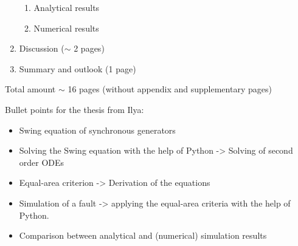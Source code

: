 \begin{enumerate}
\begin{enumerate}
        \item Analytical results
        \item Numerical results
    \end{enumerate}
    \item Discussion ($\sim$ 2 pages)
    \item Summary and outlook (1 page)
\end{enumerate}

Total amount $\sim$ 16 pages (without appendix and supplementary pages)

\newpage
Bullet points for the thesis from Ilya:
\begin{itemize}
    \item Swing equation of synchronous generators
    \item Solving the Swing equation with the help of Python -> Solving of second order ODEs
    \item Equal-area criterion -> Derivation of the equations
    \item Simulation of a fault -> applying the equal-area criteria with the help of Python.
    \item Comparison between analytical and (numerical) simulation results
\end{itemize}


